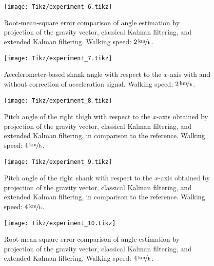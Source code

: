 \begin{figure}
	\centering
	\setlength\figureheight{7cm} 
	\setlength\figurewidth{\textwidth}
	\texttt{[image: Tikz/experiment\_6.tikz]}
	\caption{Root-mean-square error comparison of angle estimation by projection of the gravity vector, classical Kalman filtering, and extended Kalman filtering. Walking speed: $\unitfrac[2]{km}{h}$.}
	\label{fig:experiment_6}
\end{figure}

\begin{figure}
	\centering
	\setlength\figureheight{7cm} 
	\setlength\figurewidth{\textwidth}
	\texttt{[image: Tikz/experiment\_7.tikz]}
	\caption{Accelerometer-based shank angle with respect to the $x$-axis with and without correction of acceleration signal. Walking speed: $\unitfrac[2]{km}{h}$.}
	\label{fig:experiment_7}
\end{figure}

\begin{figure}
	\centering
	\setlength\figureheight{6.8cm} 
	\setlength\figurewidth{\textwidth}
	\texttt{[image: Tikz/experiment\_8.tikz]}
	\caption{Pitch angle of the right thigh with respect to the $x$-axis obtained by projection of the gravity vector, classical Kalman filtering, and extended Kalman filtering, in comparison to the reference. Walking speed: $\unitfrac[4]{km}{h}$.}
	\label{fig:experiment_8}
\end{figure}

\begin{figure}
	\centering
	\setlength\figureheight{6.8cm} 
	\setlength\figurewidth{\textwidth}
	\texttt{[image: Tikz/experiment\_9.tikz]}
	\caption{Pitch angle of the right shank with respect to the $x$-axis obtained by projection of the gravity vector, classical Kalman filtering, and extended Kalman filtering, in comparison to the reference. Walking speed: $\unitfrac[4]{km}{h}$.}
	\label{fig:experiment_9}
\end{figure}

\begin{figure}
	\centering
	\setlength\figureheight{7cm} 
	\setlength\figurewidth{\textwidth}
	\texttt{[image: Tikz/experiment\_10.tikz]}
	\caption{Root-mean-square error comparison of angle estimation by projection of the gravity vector, classical Kalman filtering, and extended Kalman filtering. Walking speed: $\unitfrac[4]{km}{h}$.}
	\label{fig:experiment_10}
\end{figure}

